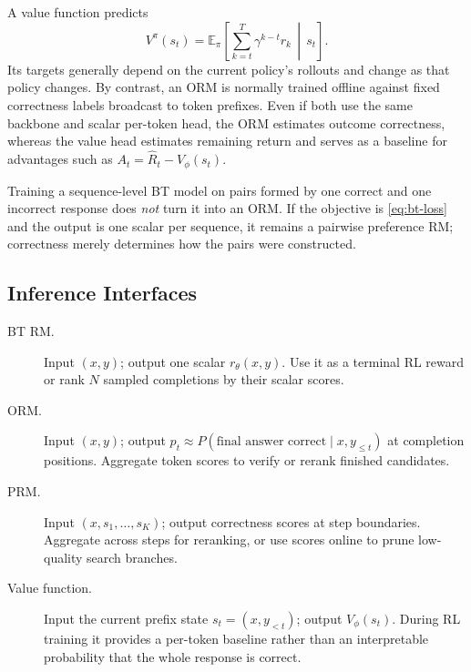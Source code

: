 A value function predicts
\begin{equation}
    V^\pi(s_t)
    =
    \mathbb{E}_{\pi}\!\left[
        \sum_{k=t}^{T}\gamma^{k-t}r_k
        \,\middle|\,s_t
    \right].
\end{equation}
Its targets generally depend on the current policy's rollouts and change as
that policy changes.  By contrast, an ORM is normally trained offline against
fixed correctness labels broadcast to token prefixes.  Even if both use the
same backbone and scalar per-token head, the ORM estimates outcome
correctness, whereas the value head estimates remaining return and serves as a
baseline for advantages such as
$A_t=\widehat{R}_t-V_\phi(s_t)$.

Training a sequence-level BT model on pairs formed by one correct and one
incorrect response does \emph{not} turn it into an ORM.  If the objective is
\eqref{eq:bt-loss} and the output is one scalar per sequence, it remains a
pairwise preference RM; correctness merely determines how the pairs were
constructed.

\subsection{Inference Interfaces}

\begin{description}
    \item[BT RM.]
    Input $(x,y)$; output one scalar $r_\theta(x,y)$.  Use it as a terminal
    RL reward or rank $N$ sampled completions by their scalar scores.

    \item[ORM.]
    Input $(x,y)$; output
    $p_t\approx P(\text{final answer correct}\mid x,y_{\leq t})$ at completion
    positions.  Aggregate token scores to verify or rerank finished
    candidates.

    \item[PRM.]
    Input $(x,s_1,\ldots,s_K)$; output correctness scores at step boundaries.
    Aggregate across steps for reranking, or use scores online to prune
    low-quality search branches.

    \item[Value function.]
    Input the current prefix state $s_t=(x,y_{<t})$; output $V_\phi(s_t)$.
    During RL training it provides a per-token baseline rather than an
    interpretable probability that the whole response is correct.
\end{description}

